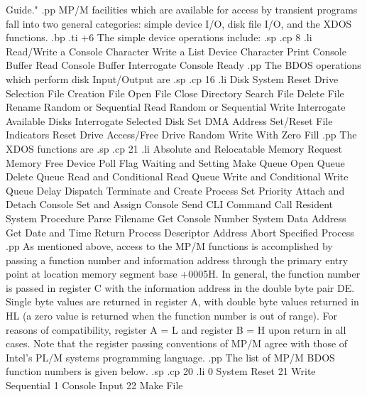 Guide."
.pp
MP/M facilities which are available for access by transient
programs fall into two general categories:  simple device
I/O, disk file I/O, and the XDOS functions.
.bp
.ti +6
The simple device operations include:
.sp
.cp 8
.li
               Read/Write a Console Character
               Write a List Device Character
               Print Console Buffer
               Read Console Buffer
               Interrogate Console Ready
.pp
The BDOS operations which perform disk Input/Output are
.sp
.cp 16
.li
               Disk System Reset
               Drive Selection
               File Creation
               File Open
               File Close
               Directory Search
               File Delete
               File Rename
               Random or Sequential Read
               Random or Sequential Write
               Interrogate Available Disks
               Interrogate Selected Disk
               Set DMA Address
               Set/Reset File Indicators
               Reset Drive
               Access/Free Drive
               Random Write With Zero Fill
.pp
The XDOS functions are
.sp
.cp 21
.li
	       Absolute and Relocatable Memory Request
	       Memory Free
	       Device Poll
	       Flag Waiting and Setting
	       Make Queue
	       Open Queue
	       Delete Queue
	       Read and Conditional Read Queue
	       Write and Conditional Write Queue
	       Delay
	       Dispatch
	       Terminate and Create Process
	       Set Priority
	       Attach and Detach Console
	       Set and Assign Console
	       Send CLI Command
	       Call Resident System Procedure
	       Parse Filename
	       Get Console Number
	       System Data Address
	       Get Date and Time
	       Return Process Descriptor Address
	       Abort Specified Process
.pp
As mentioned above, access to the MP/M functions is accomplished
by passing a function number and information address through the
primary entry point at location memory segment base +0005H.
In general, the function number is passed in register C with
the information address in the double byte pair DE.
Single byte values are returned in register A, with
double byte values returned in HL
(a zero value is returned when the function number is
out of range).
For reasons of compatibility,
register A = L and register B = H upon return in all cases.
Note that the register passing conventions of MP/M agree with
those of Intel's PL/M systems programming language.
.pp
The list of MP/M BDOS function numbers is given below.
.sp
.cp 20
.li
      0  System Reset           21  Write Sequential
      1  Console Input          22  Make File
